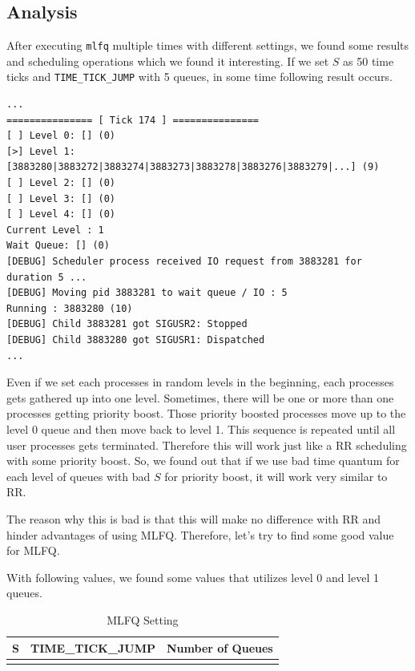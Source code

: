 \documentclass{homework}
\begin{document}
\subsection{Analysis}
After executing \texttt{mlfq} multiple times with different settings, we found some results and scheduling operations which we found it interesting. If we set $S$ as 50 time ticks and \texttt{TIME_TICK_JUMP} with 5 queues, in some time following result occurs.
\\
\begin{center}
\begin{code}
\begin{verbatim}
...
=============== [ Tick 174 ] ===============
[ ] Level 0: [] (0)
[>] Level 1: [3883280|3883272|3883274|3883273|3883278|3883276|3883279|...] (9)
[ ] Level 2: [] (0)
[ ] Level 3: [] (0)
[ ] Level 4: [] (0)
Current Level : 1
Wait Queue: [] (0)
[DEBUG] Scheduler process received IO request from 3883281 for duration 5 ...
[DEBUG] Moving pid 3883281 to wait queue / IO : 5
Running : 3883280 (10)
[DEBUG] Child 3883281 got SIGUSR2: Stopped
[DEBUG] Child 3883280 got SIGUSR1: Dispatched
...
\end{verbatim}
\end{code}
\end{center}
Even if we set each processes in random levels in the beginning, each processes gets gathered up into one level. Sometimes, there will be one or more than one processes getting priority boost. Those priority boosted processes move up to the level 0 queue and then move back to level 1. This sequence is repeated until all user processes gets terminated. Therefore this will work just like a RR scheduling with some priority boost. So, we found out that if we use bad time quantum for each level of queues with bad $S$ for priority boost, it will work very similar to RR.

The reason why this is bad is that this will make no difference with RR and hinder advantages of using MLFQ. Therefore, let's try to find some good value for MLFQ.
\pagebreak

With following values, we found some values that utilizes level 0 and level 1 queues.
\begin{center}
\begin{table}[h]
\begin{tabularx}{1.0\textwidth} { 
  | >{\centering\arraybackslash}X 
  | >{\centering\arraybackslash}X 
  | >{\centering\arraybackslash}X | }
 \hline
 S & TIME_TICK_JUMP & Number of Queues\\
 \hline
 20 & 3 & 5\\
\hline
\end{tabularx}
\caption{MLFQ Setting}
\end{table}
\end{center}
\end{document}
